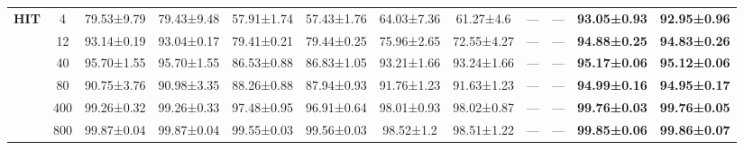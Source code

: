\documentclass[journal]{IEEEtran}
\begin{document}
\begin{table}[!t]
\begin{tabular}{@{\hspace{2pt}}c|c|cc|cc|cc|c|c|cc@{\hspace{2pt}}}
  \midrule
  
  \multirow{6}{*}{\textbf{HIT}} 
  & 4    & 79.53±9.79   & 79.43±9.48   & 57.91±1.74  & 57.43±1.76  & 64.03±7.36  & 61.27±4.6   & ---       & ---       & \textbf{93.05±0.93}  & \textbf{92.95±0.96} \\
  & 12   & 93.14±0.19   & 93.04±0.17   & 79.41±0.21  & 79.44±0.25  & 75.96±2.65  & 72.55±4.27  & ---       & ---       & \textbf{94.88±0.25}  & \textbf{94.83±0.26} \\
  & 40   & 95.70±1.55   & 95.70±1.55   & 86.53±0.88  & 86.83±1.05  & 93.21±1.66  & 93.24±1.66  & ---       & ---       & \textbf{95.17±0.06}  & \textbf{95.12±0.06} \\
  & 80   & 90.75±3.76   & 90.98±3.35   & 88.26±0.88  & 87.94±0.93  & 91.76±1.23  & 91.63±1.23  & ---       & ---       & \textbf{94.99±0.16}  & \textbf{94.95±0.17} \\
  & 400  & 99.26±0.32   & 99.26±0.33   & 97.48±0.95  & 96.91±0.64  & 98.01±0.93  & 98.02±0.87  & ---       & ---       & \textbf{99.76±0.03}  & \textbf{99.76±0.05} \\
  & 800  & 99.87±0.04   & 99.87±0.04   & 99.55±0.03  & 99.56±0.03  & 98.52±1.2   & 98.51±1.22  & ---       & ---       & \textbf{99.85±0.06}  & \textbf{99.86±0.07} \\
  
  \bottomrule
\end{tabular}
\end{table}

\end{document}
